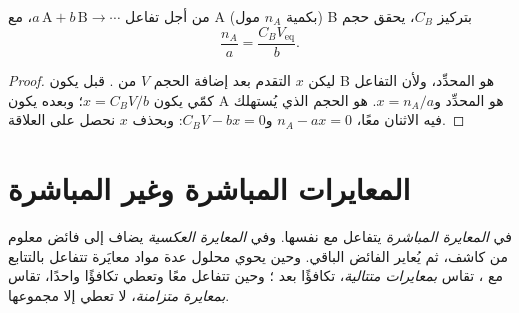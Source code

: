 \begin{proposition}\label{prop:b1:titration-methods:equivalence}
من أجل تفاعل  $a\,\mathrm{A} + b\,\mathrm{B} \to \cdots$، مع
 A (بكمية $n_A$ مول)  B بتركيز $C_B$، يحقق
حجم 
\[
  \frac{n_A}{a} = \frac{C_B V_{\mathrm{eq}}}{b} .
\]
\end{proposition}

\begin{proof}
ليكن $x$ التقدم بعد إضافة الحجم $V$ من . قبل  يكون B
هو المحدِّد، ولأن التفاعل كمّي يكون $x = C_BV/b$؛ وبعده
يكون A هو المحدِّد و$x = n_A/a$.  هو الحجم الذي يُستهلك فيه الاثنان
معًا، $n_A - ax = 0$ و$C_BV - bx = 0$: وبحذف $x$
نحصل على العلاقة.
\end{proof}

\section{المعايرات المباشرة وغير المباشرة}

\begin{definition}\label{def:b1:titration-methods:kinds}
في \emph{المعايرة المباشرة} يتفاعل 
مع  نفسها. وفي \emph{المعايرة العكسية}
يضاف إلى  فائض معلوم من كاشف، ثم يُعاير الفائض الباقي.
وحين يحوي محلول عدة مواد معايَرة تتفاعل
بالتتابع مع ، تقاس \emph{بمعايرات
متتالية}، تكافؤًا بعد ؛
وحين تتفاعل معًا وتعطي تكافؤًا واحدًا، تقاس \emph{بمعايرة
متزامنة}، لا تعطي
إلا مجموعها.
\end{definition}

